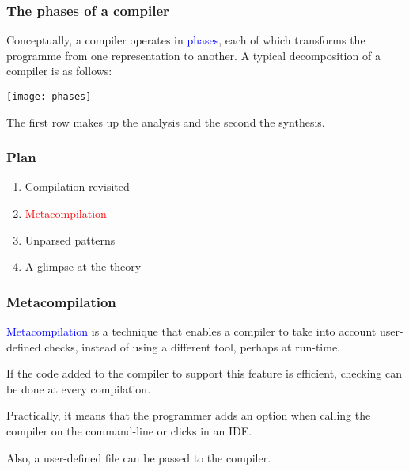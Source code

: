 \documentclass[compress,dvips,xcolor={dvipsnames},t]{beamer}
\begin{document}
% 
\begin{frame}
\frametitle{The phases of a compiler}

\label{phases}


Conceptually, a compiler operates in \textcolor{blue}{phases}, each of which
transforms the programme from one representation to another. A typical
decomposition of a compiler is as follows:
\begin{center}
\texttt{[image: phases]}
\end{center}
The first row makes up the analysis and the second the synthesis.
\end{frame}


% 
\begin{frame}
\frametitle{Plan}


\begin{enumerate}

  \item Compilation revisited

  \item \textcolor{red}{Metacompilation}

  \item Unparsed patterns

  \item A glimpse at the theory

\end{enumerate}

\end{frame}


% 
\begin{frame}
\frametitle{Metacompilation}


\textcolor{blue}{Metacompilation} is a technique that enables a compiler to
take into account user\hyp{}defined checks, instead of using a
different tool, perhaps at run\hyp{}time.

If the code added to the compiler to support this feature is
efficient, checking can be done at every compilation.

Practically, it means that the programmer adds an option when calling
the compiler on the command\hyp{}line or clicks in an IDE.

Also, a user\hyp{}defined file can be passed to the compiler.

\end{frame}
\end{document}
